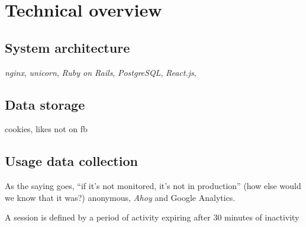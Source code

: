 
\chapter{Technical overview}

\section{System architecture}

\emph{nginx}, \emph{unicorn}, \emph{Ruby on Rails}, \emph{PostgreSQL}, \emph{React.js}, 

\section{Data storage}

cookies, likes not on fb

\section{Usage data collection}

As the saying goes, ``if it's not monitored, it's not in production'' \cite{monitored} (how else would we know that it was?) anonymous, \emph{Ahoy} and Google Analytics.

A session is defined by a period of activity expiring after 30 minutes of inactivity